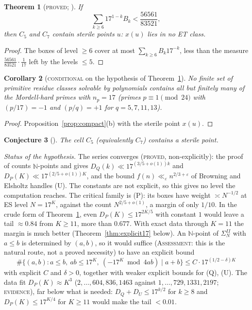 \documentclass[11pt,reqno]{amsart}
\newtheorem{theorem}{Theorem}[section]
\newtheorem{corollary}[theorem]{Corollary}
\newtheorem{conjecture}[theorem]{Conjecture}
\theoremstyle{definition}
\newcommand{\N}{\mathbb N}
\newcommand{\status}[1]{\textup{\textsc{#1}}}
\begin{document}
\begin{theorem}[\status{proved}; {\cite[Thm.~4.1]{PM17}}]\label{thm:tail17}
If
\[
\sum_{k\ge6}17^{1-k}B_k<\frac{56561}{83521},
\]
then $C_5$ and $C_7$ contain sterile points $u$: $x(u)$ lies in no ET
class.
\end{theorem}

\begin{proof}
The boxes of level $\ge6$ cover at most $\sum_{k\ge6}B_k17^{-k}$, less
than the measure $\frac{56561}{83521}\cdot\frac1{17}$ left by the levels
$\le5$.
\end{proof}

\begin{corollary}[\status{conditional} on the hypothesis of Theorem~\ref{thm:tail17}]\label{cor:17}
No finite set of primitive residue classes solvable by polynomials
contains all but finitely many of the Mordell-hard primes with $n_p=17$
(primes $p\equiv1\pmod{24}$ with $(p/17)=-1$ and $(p/q)=+1$ for
$q=5,7,11,13$).
\end{corollary}

\begin{proof}
Proposition~\ref{prop:compact}(b) with the sterile point $x(u)$.
\end{proof}

\begin{conjecture}[{\cite[Conj.~4.3]{PM17}}]\label{conj:17}
The cell $C_5$ (equivalently $C_7$) contains a sterile point.
\end{conjecture}

\emph{Status of the hypothesis.}  The series converges
(\status{proved}, non-explicitly): the proof of \cite[Prop.~1.7]{ET}
counts $\N$-points and gives $D_Q(k)\ll17^{(3/5+o(1))k}$ and
$D_P(K)\ll17^{(2/5+o(1))K}$, and the bound $f(n)\ll_\varepsilon
n^{2/3+\varepsilon}$ of Browning and Elsholtz \cite{BE} handles
(U).  The constants are not explicit, so this gives no level the
computation reaches.  The critical family is (P): its boxes have weight
$\asymp N^{-1/2}$ at ES level $N=17^K$, against the count
$N^{2/5+o(1)}$, a margin of only $1/10$.  In the crude form of
Theorem~\ref{thm:tail17}, even $D_P(K)\le17^{2K/5}$ with constant $1$
would leave a tail $\approx0.84$ from $K\ge11$, more than $0.677$.  With
exact data through $K=11$ the margin is much better
(Theorem~\ref{thm:explicit17} below).  An $\N$-point of $\Sigma^{II}_N$ with $a\le b$ is determined by
$(a,b)$, so it would suffice (\status{Assessment}: this is the natural
route, not a proved necessity) to have an explicit bound
\begin{equation}\label{eq:Pcount}
\#\{(a,b):a\le b,\ ab\le17^K,\ (-17^K\bmod 4ab)\mid a+b\}\le
C\cdot17^{(1/2-\delta)K}
\end{equation}
with explicit $C$ and $\delta>0$, together with weaker explicit bounds
for (Q), (U).  The data fit $D_P(K)\approx K^3$
($2,\dots,604,836,1463$ against $1,\dots,729,1331,2197$; \status{evidence}), far
below what is needed: $D_Q+D_U\le17^{k/2}$ for $k\ge8$ and $D_P(K)\le
17^{K/4}$ for $K\ge11$ would make the tail $<0.01$.
\end{document}

